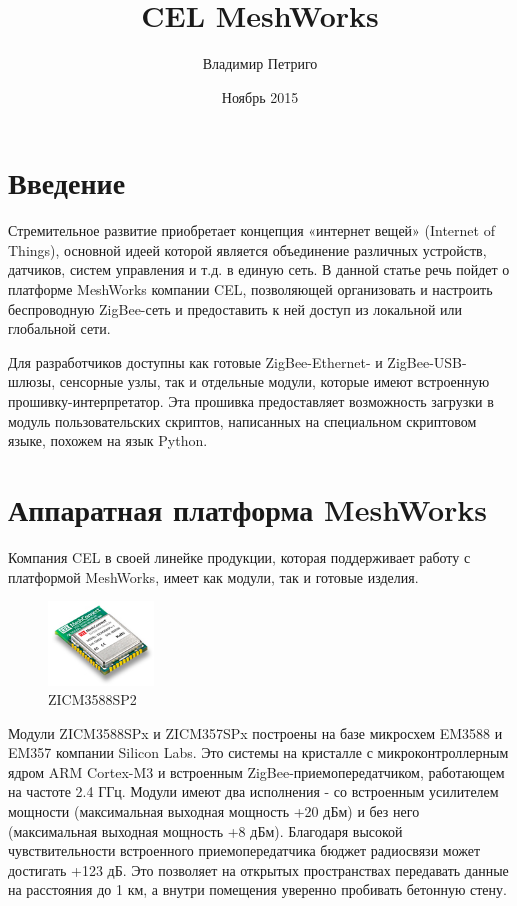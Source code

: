 \documentclass[11pt]{article}
\title{CEL MeshWorks}
\author{Владимир Петриго}
\date{Ноябрь 2015}
\begin{document}
\maketitle

\section*{Введение}

Стремительное развитие приобретает концепция «интернет вещей» (Internet of Things),
основной идеей которой является объединение различных устройств, датчиков, систем
управления и т.д. в единую сеть. В данной статье речь пойдет о платформе MeshWorks 
компании CEL, позволяющей организовать и настроить беспроводную ZigBee-сеть и предоставить
к ней доступ из локальной или глобальной сети.

Для разработчиков доступны как готовые ZigBee-Ethernet- и ZigBee-USB-шлюзы, 
сенсорные узлы, так и отдельные модули, которые имеют встроенную 
прошивку-интерпретатор. Эта прошивка предоставляет возможность загрузки в модуль
пользовательских скриптов, написанных на специальном скриптовом языке, похожем на язык Python.

\section*{Аппаратная платформа MeshWorks}

Компания CEL в своей линейке продукции, которая поддерживает работу с платформой 
MeshWorks, имеет как модули, так и готовые изделия.
\begin{figure}
  \begin{center}
    \includegraphics[width=0.25\textwidth]{mc_em358x_mini.jpg}
  \end{center}
  \caption{ZICM3588SP2}
\end{figure}
Модули ZICM3588SPx и ZICM357SPx построены на базе микросхем EM3588 и EM357 компании
Silicon Labs. Это системы на кристалле с микроконтроллерным ядром ARM Cortex-M3 и
встроенным ZigBee-приемопередатчиком, работающем на частоте 2.4 ГГц. Модули имеют
два исполнения - со встроенным усилителем мощности (максимальная выходная мощность
+20 дБм) и без него (максимальная выходная мощность +8 дБм). Благодаря высокой 
чувствительности встроенного приемопередатчика бюджет радиосвязи может достигать 
+123 дБ. Это позволяет на открытых пространствах передавать данные на расстояния до 1 км,
а внутри помещения уверенно пробивать бетонную стену.
\end{document}
